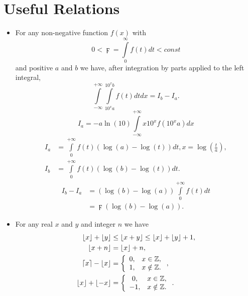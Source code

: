 \documentclass[titlepage,fleqn]{article}%
\providecommand{\U}[1]{\protect\rule{.1in}{.1in}}
\begin{document}
\section{Useful Relations}

\bigskip

\begin{itemize}
\item For any non-negative function $f(x)$ with \
\[
0<\digamma=%
{\displaystyle\int\limits_{0}^{\infty}}
f(t)dt<const
\]
and positive $a$ and $b$ we have, after integration by parts applied to the
left integral,
\[%
{\displaystyle\int\limits_{-\infty}^{+\infty}}
{\displaystyle\int\limits_{10^{x}a}^{10^{x}b}}
f(t)dtdx=I_{b}-I_{a}.
\]%
\[
I_{a}=-a\ln(10)%
{\displaystyle\int\limits_{-\infty}^{+\infty}}
x10^{x}f(10^{x}a)dx
\]%
\begin{align*}
I_{a}  &  =%
{\displaystyle\int\limits_{0}^{+\infty}}
f(t)(\log(a)-\log(t))dt,x=\log\left(  \frac{t}{a}\right)  ,\\
I_{b}  &  =%
{\displaystyle\int\limits_{0}^{+\infty}}
f(t)(\log(b)-\log(t))dt.
\end{align*}%
\begin{align*}
I_{b}-I_{a}  &  =(\log(b)-\log(a))%
{\displaystyle\int\limits_{0}^{+\infty}}
f(t)dt\\
&  =\digamma(\log(b)-\log(a)).
\end{align*}


\item For any real $x$ and $y$ and integer $n$ we have%
\begin{align}
\lfloor x\rfloor+\lfloor y\rfloor &  \leq\lfloor x+y\rfloor\leq\lfloor
x\rfloor+\lfloor y\rfloor+1,\label{Prop2}\\
\lfloor x+n\rfloor &  =\lfloor x\rfloor+n,\nonumber\\
\lceil x\rceil-\lfloor x\rfloor &  =\left\{
\begin{array}
[c]{cc}%
0, & x\in%
\mathbb{Z}
,\\
1, & x\notin%
\mathbb{Z}
.
\end{array}
\right.  ,\\
\lfloor x\rfloor+\lfloor-x\rfloor &  =\left\{
\begin{array}
[c]{cc}%
0, & x\in%
\mathbb{Z}
,\\
-1, & x\notin%
\mathbb{Z}
.
\end{array}
\right.  .
\end{align}

\end{itemize}
\end{document}
